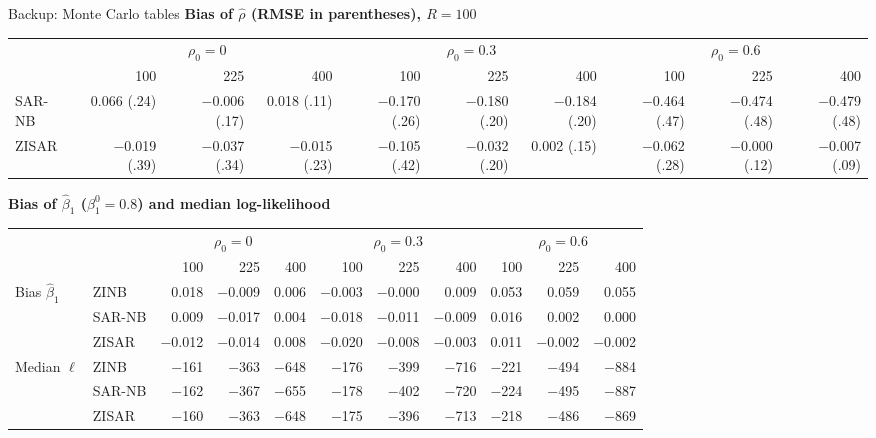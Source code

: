 \documentclass[10pt,aspectratio=169]{beamer}
\begin{document}
\begin{frame}{Backup: Monte Carlo tables}
  \tiny
  \setlength{\tabcolsep}{3.5pt}
  \textbf{Bias of $\hat\rho$ (RMSE in parentheses), $R=100$}\\[3pt]
  \begin{tabular}{l rrr rrr rrr}
    \toprule
    & \multicolumn{3}{c}{$\rho_0=0$} & \multicolumn{3}{c}{$\rho_0=0.3$} & \multicolumn{3}{c}{$\rho_0=0.6$}\\
    \cmidrule(lr){2-4}\cmidrule(lr){5-7}\cmidrule(lr){8-10}
    & 100 & 225 & 400 & 100 & 225 & 400 & 100 & 225 & 400\\
    \midrule
    SAR-NB & 0.066 (.24) & $-$0.006 (.17) & 0.018 (.11) & $-$0.170 (.26) & $-$0.180 (.20) & $-$0.184 (.20) & $-$0.464 (.47) & $-$0.474 (.48) & $-$0.479 (.48)\\
    ZISAR  & $-$0.019 (.39) & $-$0.037 (.34) & $-$0.015 (.23) & $-$0.105 (.42) & $-$0.032 (.20) & 0.002 (.15) & $-$0.062 (.28) & $-$0.000 (.12) & $-$0.007 (.09)\\
    \bottomrule
  \end{tabular}
  \vspace{0.8em}

  \textbf{Bias of $\hat\beta_1$ ($\beta_1^0=0.8$) and median log-likelihood}\\[3pt]
  \begin{tabular}{ll rrr rrr rrr}
    \toprule
    & & \multicolumn{3}{c}{$\rho_0=0$} & \multicolumn{3}{c}{$\rho_0=0.3$} & \multicolumn{3}{c}{$\rho_0=0.6$}\\
    \cmidrule(lr){3-5}\cmidrule(lr){6-8}\cmidrule(lr){9-11}
    & & 100 & 225 & 400 & 100 & 225 & 400 & 100 & 225 & 400\\
    \midrule
    \multirow{3}{*}{Bias $\hat\beta_1$} & ZINB & 0.018 & $-$0.009 & 0.006 & $-$0.003 & $-$0.000 & 0.009 & 0.053 & 0.059 & 0.055\\
    & SAR-NB & 0.009 & $-$0.017 & 0.004 & $-$0.018 & $-$0.011 & $-$0.009 & 0.016 & 0.002 & 0.000\\
    & ZISAR & $-$0.012 & $-$0.014 & 0.008 & $-$0.020 & $-$0.008 & $-$0.003 & 0.011 & $-$0.002 & $-$0.002\\
    \midrule
    \multirow{3}{*}{Median $\ell$} & ZINB & $-$161 & $-$363 & $-$648 & $-$176 & $-$399 & $-$716 & $-$221 & $-$494 & $-$884\\
    & SAR-NB & $-$162 & $-$367 & $-$655 & $-$178 & $-$402 & $-$720 & $-$224 & $-$495 & $-$887\\
    & ZISAR & $-$160 & $-$363 & $-$648 & $-$175 & $-$396 & $-$713 & $-$218 & $-$486 & $-$869\\
    \bottomrule
  \end{tabular}
\end{frame}
\end{document}
